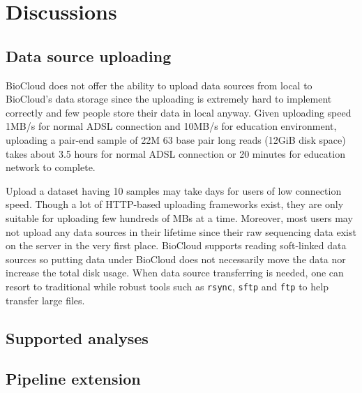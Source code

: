 \chapter{Discussions}
\label{c:discussion}


\section{Data source uploading}

BioCloud does not offer the ability to upload data sources from local to
BioCloud's data storage since the uploading is extremely hard to implement
correctly and few people store their data in local anyway. Given uploading
speed 1MB/s for normal ADSL connection and 10MB/s for education environment,
uploading a pair-end sample of 22M 63 base pair long reads (12GiB disk space)
takes about 3.5 hours for normal ADSL connection or 20 minutes for education
network to complete.

Upload a dataset having 10 samples may take days for users of low connection
speed. Though a lot of HTTP-based uploading frameworks exist, they are only
suitable for uploading few hundreds of MBs at a time. Moreover, most users may
not upload any data sources in their lifetime since their raw sequencing data
exist on the server in the very first place. BioCloud supports reading
soft-linked data sources so putting data under BioCloud does not necessarily
move the data nor increase the total disk usage. When data source transferring
is needed, one can resort to traditional while robust tools  such as
\texttt{rsync}, \texttt{sftp} and \texttt{ftp} to help transfer large files.


\section{Supported analyses}




\section{Pipeline extension}
\label{s:pipeline-extension}

